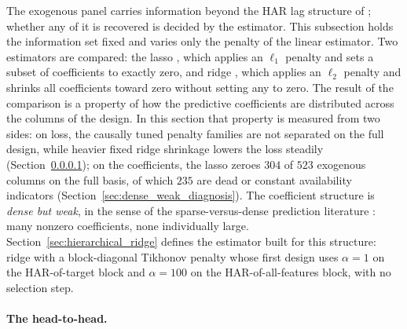 The exogenous panel carries information beyond the HAR lag
structure of \citet{Corsi2009}; whether any of it is recovered is
decided by the estimator. This subsection holds the information set
fixed and varies only the penalty of the linear estimator. Two estimators are
compared: the lasso \citep{Tibshirani1996}, which applies an $\ell_1$ penalty
and sets a subset of coefficients to exactly zero, and ridge
\citep{HoerlKennard1970}, which applies an $\ell_2$ penalty and shrinks all
coefficients toward zero without setting any to zero. The result of the
comparison is a property of how the predictive coefficients are distributed
across the columns of the design.
In this section that property is measured from two sides: on loss, the
causally tuned penalty families are not separated on the full design,
while heavier fixed ridge shrinkage lowers the loss steadily
(Section~\ref{sec:dense_weak_headtohead}); on the coefficients, the lasso
zeroes $304$ of $523$ exogenous columns on the full basis, of which $235$
are dead or constant availability indicators
(Section~\ref{sec:dense_weak_diagnosis}). The coefficient structure is
\emph{dense but weak}, in the sense of the sparse-versus-dense
prediction literature
\citep{GiannoneLenzaPrimiceri2021,KozakNagelSantosh2020,ShenXiu2025}:
many nonzero coefficients, none individually large. Section~\ref{sec:hierarchical_ridge}
defines the estimator built for this structure: ridge with a
block-diagonal Tikhonov penalty
whose first design uses $\alpha = 1$ on the HAR-of-target block and
$\alpha = 100$ on the HAR-of-all-features block, with no selection
step.

\paragraph{The head-to-head.}\label{sec:dense_weak_headtohead}
